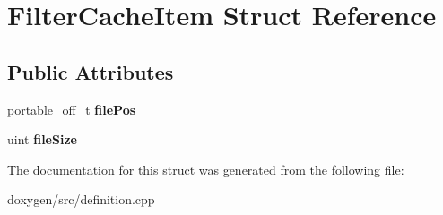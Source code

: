 \hypertarget{struct_filter_cache_item}{}\section{Filter\+Cache\+Item Struct Reference}
\label{struct_filter_cache_item}
\subsection*{Public Attributes}
\begin{DoxyCompactItemize}
\item 
\mbox{\label{struct_filter_cache_item_a299a11b01794a0983f310a3c0681763a}} 
portable\+\_\+off\+\_\+t {\bfseries file\+Pos}
\item 
\mbox{\label{struct_filter_cache_item_a9b473d985c79f0f6f931b68bfe7c2aed}} 
uint {\bfseries file\+Size}
\end{DoxyCompactItemize}


The documentation for this struct was generated from the following file\+:\begin{DoxyCompactItemize}
\item 
doxygen/src/definition.\+cpp\end{DoxyCompactItemize}
